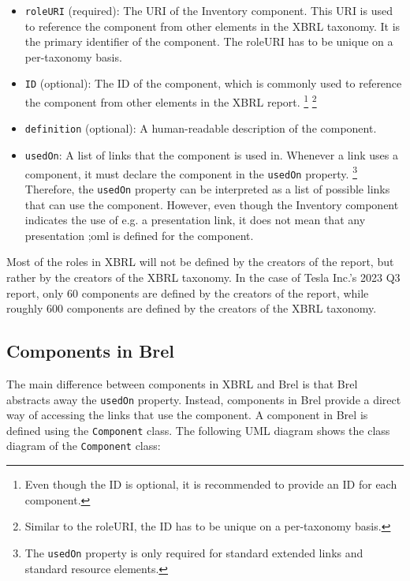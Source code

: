 \begin{itemize}
  \item \texttt{roleURI} (required): The URI of the Inventory component. This URI is used to reference the component from other elements in the XBRL taxonomy. It is the primary identifier of the component. 
  The roleURI has to be unique on a per-taxonomy basis.\cite{xbrl21_custom_roles}
  \item \texttt{ID} (optional): The ID of the component, which is commonly used to reference the component from other elements in the XBRL report.
  \footnote{Even though the ID is optional, it is recommended to provide an ID for each component.\cite{xbrl21_custom_roles}}
  \footnote{Similar to the roleURI, the ID has to be unique on a per-taxonomy basis.\cite{xml_id}}
  \item \texttt{definition} (optional): A human-readable description of the component. 
  \item \texttt{usedOn}: A list of links that the component is used in. 
  Whenever a link uses a component, it must declare the component in the \texttt{usedOn} property.
  \footnote{The \texttt{usedOn} property is only required for standard extended links and standard resource elements.\cite{xbrl21_custom_roles}}
  Therefore, the \texttt{usedOn} property can be interpreted as a list of possible links that can use the component.
  However, even though the Inventory component indicates the use of e.g. a presentation link, it does not mean that any presentation ;oml is defined for the component.
\end{itemize}

Most of the roles in XBRL will not be defined by the creators of the report, but rather by the creators of the XBRL taxonomy. 
In the case of Tesla Inc.'s 2023 Q3 report, only 60 components are defined by the creators of the report, while roughly 600 components are defined by the creators of the XBRL taxonomy.\cite{tesla_10q_2023_q3}

\subsection{Components in Brel}

The main difference between components in XBRL and Brel is that Brel abstracts away the \texttt{usedOn} property. 
Instead, components in Brel provide a direct way of accessing the links that use the component. 
A component in Brel is defined using the \texttt{Component} class. 
The following UML diagram shows the class diagram of the \texttt{Component} class:


